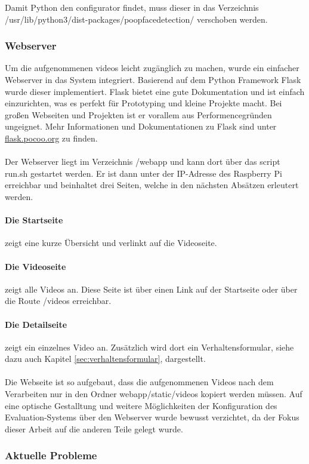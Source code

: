 Damit Python den configurator findet, muss dieser in das Verzeichnis /usr/lib/python3/dist-packages/poopfacedetection/ verschoben werden.

\subsubsection{Webserver}
Um die aufgenommenen videos leicht zugänglich zu machen, wurde ein einfacher Webserver in das System integriert. Basierend auf dem Python Framework Flask wurde dieser implementiert. Flask bietet eine gute Dokumentation und ist einfach einzurichten, was es perfekt für Prototyping und kleine Projekte macht. Bei großen Webseiten und Projekten ist er vorallem aus Performencegründen ungeignet. Mehr Informationen und Dokumentationen zu Flask sind unter \href{http://flask.pocoo.org/}{flask.pocoo.org} zu finden. \\
\\
Der Webserver liegt im Verzeichnis /webapp und kann dort über das script run.sh gestartet werden. Er ist dann unter der IP-Adresse des Raspberry Pi erreichbar und beinhaltet drei Seiten, welche in den nächsten Absätzen erleutert werden. 

\paragraph{Die Startseite} zeigt eine kurze Übersicht und verlinkt auf die Videoseite.

\paragraph{Die Videoseite} zeigt alle Videos an. Diese Seite ist über einen Link auf der Startseite oder über die Route /videos erreichbar.

\paragraph{Die Detailseite} zeigt ein einzelnes Video an. Zusätzlich wird dort ein Verhaltensformular, siehe dazu auch Kapitel \ref{sec:verhaltensformular}, dargestellt. \\
\\
Die Webseite ist so aufgebaut, dass die aufgenommenen Videos nach dem Verarbeiten nur in den Ordner webapp/static/videos kopiert werden müssen. Auf eine optische Gestalltung und weitere Möglichkeiten der Konfiguration des Evaluation-Systems über den Webserver wurde bewusst verzichtet, da der Fokus dieser Arbeit auf die anderen Teile gelegt wurde.

\subsubsection{Aktuelle Probleme}

